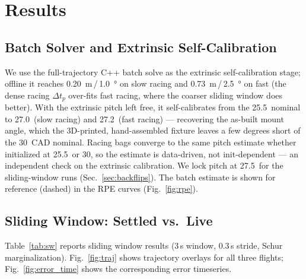 \documentclass[journal]{IEEEtran}
\begin{document}
\section{Results}
\label{sec:results}

\subsection{Batch Solver and Extrinsic Self-Calibration}
We use the full-trajectory C++ batch solve as the extrinsic
self-calibration stage; offline it reaches
\SI{0.20}{\metre}\,/\,\SI{1.0}{\degree} on slow racing and
\SI{0.73}{\metre}\,/\,\SI{2.5}{\degree} on fast (the dense racing
$\Delta t_p$ over-fits fast racing, where the coarser sliding window
does better).
With the extrinsic pitch left free, it self-calibrates from the
25.5\degree\ nominal to 27.0\degree\ (slow racing) and 27.2\degree\
(fast racing) --- recovering the as-built mount angle, which the
3D-printed, hand-assembled fixture leaves a few degrees short of the
30\degree\ CAD nominal.  Racing bags converge to the same pitch estimate
whether initialized at 25.5\degree\ or 30\degree, so the estimate is
data-driven, not init-dependent --- an independent check on the
extrinsic calibration.  We lock pitch at 27.5\degree\ for the
sliding-window runs (Sec.~\ref{sec:backflips}).  The batch estimate is
shown for reference (dashed) in the RPE curves (Fig.~\ref{fig:rpe}).

\subsection{Sliding Window: Settled vs.\ Live}
\label{sec:sw_results}

Table~\ref{tab:sw} reports sliding window results
(3\,s window, 0.3\,s stride, Schur marginalization).
Fig.~\ref{fig:traj} shows trajectory overlays for all three flights;
Fig.~\ref{fig:error_time} shows the corresponding error timeseries.
\end{document}
